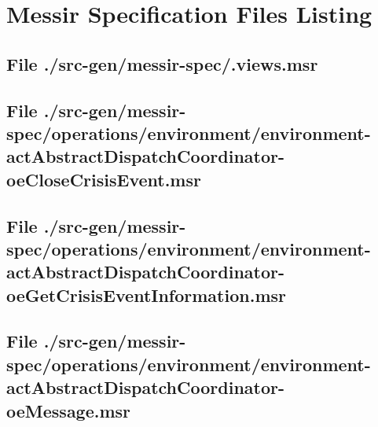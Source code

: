 \chapter{Messir Specification Files Listing}

\section[File /src-gen/messir-spec/.views.msr]{File ./src-gen/messir-spec/.views.msr}
\scriptsize

\normalsize
	
\section[File /.../environment-actAbstractDispatchCoordinator-oeCloseCrisisEvent.msr]{File ./src-gen/messir-spec/operations/environment/environment-actAbstractDispatchCoordinator-oeCloseCrisisEvent.msr}
\scriptsize

\normalsize
	
\section[File /.../environment-actAbstractDispatchCoordinator-oeGetCrisisEventInformation.msr]{File ./src-gen/messir-spec/operations/environment/environment-actAbstractDispatchCoordinator-oeGetCrisisEventInformation.msr}
\scriptsize

\normalsize
	
\section[File /src-gen.../environment-actAbstractDispatchCoordinator-oeMessage.msr]{File ./src-gen/messir-spec/operations/environment/environment-actAbstractDispatchCoordinator-oeMessage.msr}
\scriptsize

\normalsize
	
